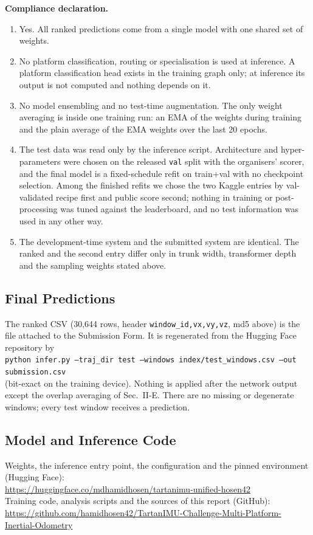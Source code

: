 \documentclass[letterpaper,10pt,conference]{ieeeconf}
\newcommand{\hfrepo}{\url{https://huggingface.co/mdhamidhosen/tartanimu-unified-hosen42}}
\newcommand{\ghrepo}{\url{https://github.com/hamidhosen42/TartanIMU-Challenge-Multi-Platform-Inertial-Odometry}}
\begin{document}
\begin{sloppypar}
\textbf{Compliance declaration.}
\begin{enumerate}
    \item Yes. All ranked predictions come from a single model with one shared set of weights.
    \item No platform classification, routing or specialisation is used at inference. A platform classification
    head exists in the training graph only; at inference its output is not computed and nothing depends on it.
    \item No model ensembling and no test-time augmentation. The only weight averaging is inside one training run:
    an EMA of the weights during training and the plain average of the EMA weights over the last 20 epochs.
    \item The test data was read only by the inference script. Architecture and hyper-parameters were chosen on
    the released \texttt{val} split with the organisers' scorer, and the final model is a fixed-schedule refit on
    train+val with no checkpoint selection. Among the finished refits we chose the two Kaggle entries by
    val-validated recipe first and public score second; nothing in training or post-processing was tuned against the
    leaderboard, and no test information was used in any other way.
    \item The development-time system and the submitted system are identical. The ranked and the second entry
    differ only in trunk width, transformer depth and the sampling weights stated above.
\end{enumerate}
\end{sloppypar}

\subsection{Final Predictions}
The ranked CSV (30,644 rows, header \texttt{window\_id,vx,vy,vz}, md5 above) is the file attached to the Submission
Form. It is regenerated from the Hugging Face repository by\\
\texttt{python infer.py --traj\_dir test \allowbreak --windows index/test\_windows.csv \allowbreak --out submission.csv}\\
(bit-exact on the training device). Nothing is applied after the network output except the overlap averaging of
Sec.~II-E. There are no missing or degenerate windows; every test window receives a prediction.

\subsection{Model and Inference Code}
Weights, the inference entry point, the configuration and the pinned environment (Hugging Face):\\
\hfrepo\\
Training code, analysis scripts and the sources of this report (GitHub):\\
\ghrepo
\end{document}
